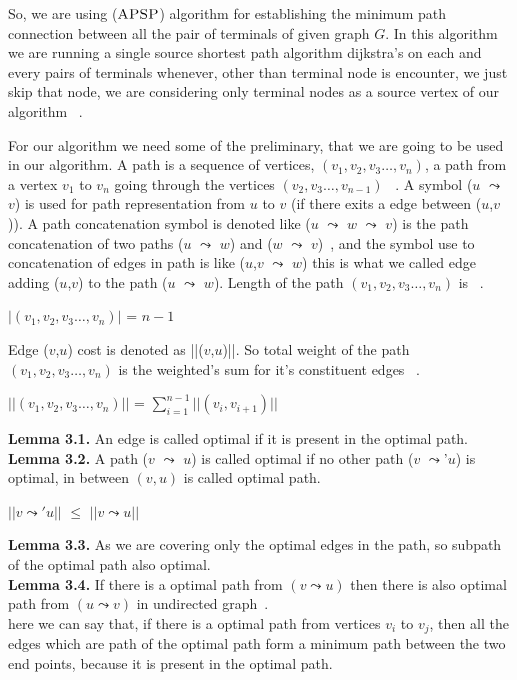  So, we are using ($\textsc{APSP}$) algorithm for establishing the minimum path connection between all the pair of terminals of given graph $G$. In this algorithm we are running a single source shortest path algorithm dijkstra's on each and every pairs of terminals whenever, other than terminal node is encounter, we just skip that node, we are considering only terminal nodes as a source vertex of our algorithm ~\cite{cormen}.

 For our algorithm we need some of the preliminary, that we are going to be used in our algorithm. A path is a sequence of vertices, $(v_1,v_2,v_3 \dots, v_n)$, a path from a vertex $v_1$ to $v_n$ going through the vertices $(v_2,v_3 \dots, v_{n-1})$ ~\cite{karger}. A symbol ($u$ $\leadsto$ $v$) is used for path representation from $u$ to $v$ (if there exits a edge between ($u$,$v$)). A path concatenation symbol is denoted like ($u$ $\leadsto$ $w$ $\leadsto$ $v$) is the path concatenation of two paths ($u$ $\leadsto$ $w$) and ($w$ $\leadsto$ $v$)~\cite{karger}, and the symbol use to concatenation of edges in path is like ($u$,$v$ $\leadsto$ $w$) this is what we called edge adding ($u$,$v$) to the path ($u$ $\leadsto$ $w$). Length of the path $(v_1,v_2,v_3 \dots, v_n)$ is ~\cite{seidel}.

\begin{center}
$|(v_1,v_2,v_3 \dots, v_n)|$  = $n-1$
\end{center} 
Edge ($v$,$u$) cost is denoted as ||($v$,$u$)||. So total weight of the path $(v_1,v_2,v_3 \dots, v_n)$ is the weighted's sum for it's constituent edges ~\cite{karger}.
\begin{center}
$||(v_1,v_2,v_3 \dots, v_n)||$ = $\sum_{i=1}^{n-1} ||(v_i, v_{i+1})||$
\end{center}
\textbf{Lemma 3.1.} An edge is called optimal if it is present in the optimal path.\\
\textbf{Lemma 3.2.} A path ($v$ $\leadsto$ $u$) is called optimal if no other path ($v$ $\leadsto$'$u$) is optimal, in between $(v,u)$ is called optimal path.
\begin{center}
$||v\leadsto' u||$ $\leq$ $||v\leadsto u||$ 
\end{center}
\textbf{Lemma 3.3.} As we are covering only the optimal edges in the path, so subpath of the optimal path also optimal.\\
\textbf{Lemma 3.4.} If there is a optimal path from $(v \leadsto u)$ then there is also optimal path from $(u \leadsto v)$ in undirected graph~\cite{karger}.\\
here we can say that, if there is a optimal path from vertices $v_i$ to $v_j$, then all the edges which are path of the optimal path form a minimum path between the two end points, because it is present in the optimal path.
